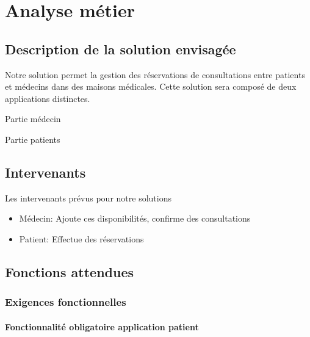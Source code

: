 \documentclass[a4paper,11pt]{article}
\begin{document}
	\section{Analyse métier}	
	\subsection{Description de la solution envisagée}
	
	Notre solution permet la gestion des réservations de consultations entre patients et médecins dans des maisons médicales. Cette solution sera composé de deux applications distinctes.
	
	Partie médecin
	
	Partie patients
	
	\subsection{Intervenants}
	
	Les intervenants prévus pour notre solutions
	\begin{itemize}
		\item Médecin: Ajoute ces disponibilités, confirme des consultations
		\item Patient: Effectue des réservations
	\end{itemize}
	
	\newpage
	
	\subsection{Fonctions attendues}
	
	\subsubsection{Exigences fonctionnelles}
	
	\paragraph{Fonctionnalité obligatoire application patient}
	
\end{document}
